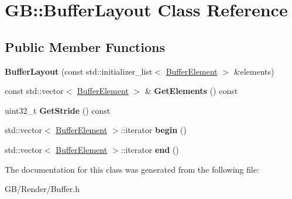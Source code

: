 \hypertarget{class_g_b_1_1_buffer_layout}{}\section{GB\+::Buffer\+Layout Class Reference}
\label{class_g_b_1_1_buffer_layout}
\subsection*{Public Member Functions}
\begin{DoxyCompactItemize}
\item 
\mbox{\label{class_g_b_1_1_buffer_layout_ab379dac45591be54f62a94fdf99082bc}} 
{\bfseries Buffer\+Layout} (const std\+::initializer\+\_\+list$<$ \mbox{\hyperlink{struct_g_b_1_1_buffer_element}{Buffer\+Element}} $>$ \&elements)
\item 
\mbox{\label{class_g_b_1_1_buffer_layout_aaea793ea49bbc10df1c6d32b96e6d563}} 
const std\+::vector$<$ \mbox{\hyperlink{struct_g_b_1_1_buffer_element}{Buffer\+Element}} $>$ \& {\bfseries Get\+Elements} () const
\item 
\mbox{\label{class_g_b_1_1_buffer_layout_a982876a3f6ce95bf1b0c418edd2b2bd0}} 
uint32\+\_\+t {\bfseries Get\+Stride} () const
\item 
\mbox{\label{class_g_b_1_1_buffer_layout_a64a08958622faaa1e7d59409981f5223}} 
std\+::vector$<$ \mbox{\hyperlink{struct_g_b_1_1_buffer_element}{Buffer\+Element}} $>$\+::iterator {\bfseries begin} ()
\item 
\mbox{\label{class_g_b_1_1_buffer_layout_ae693fa49961204f79a761bab0e733483}} 
std\+::vector$<$ \mbox{\hyperlink{struct_g_b_1_1_buffer_element}{Buffer\+Element}} $>$\+::iterator {\bfseries end} ()
\end{DoxyCompactItemize}


The documentation for this class was generated from the following file\+:\begin{DoxyCompactItemize}
\item 
G\+B/\+Render/Buffer.\+h\end{DoxyCompactItemize}
